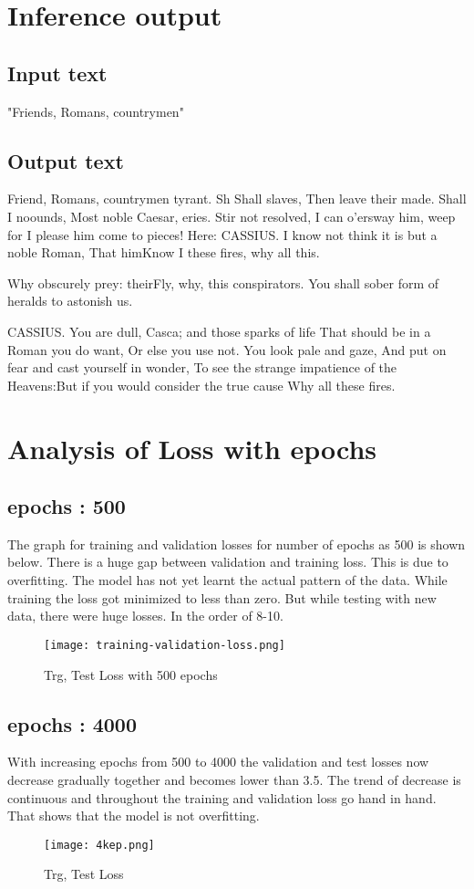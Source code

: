 \documentclass[conference]{IEEEtran}
\begin{document}
\section{Inference output}
\subsection{Input text} 
"Friends, Romans, countrymen"
\subsection{Output text} 
Friend, Romans, countrymen tyrant. Sh Shall slaves, Then leave their made. Shall I noounds, Most noble Caesar, eries. Stir not resolved,
I can o’ersway him, weep for I please him come to pieces! Here:
CASSIUS.
I know not think it is but a noble Roman, That himKnow I these fires, why all this.

Why obscurely prey: theirFly, why, this conspirators. You shall sober form of heralds to astonish us.

CASSIUS. You are dull, Casca; and those sparks of life That should be in a Roman you do want, Or else you use not. You look pale and gaze, And put on fear and cast yourself in wonder, To see the strange impatience of the Heavens:But if you would consider the true cause Why all these fires.
\section{Analysis of Loss with epochs}
\subsection{epochs : 500}
The graph for training and validation losses for number of epochs as 500 is shown below. There is a huge gap between validation and training loss. This is due to overfitting. The model has not yet learnt the actual pattern of the data. While training the loss got minimized to less than zero. But while testing with new data, there were huge losses. In the order of 8-10.
\begin{figure}[H]
    \centering
    \texttt{[image: training-validation-loss.png]}
    \caption{Trg, Test Loss with 500 epochs}
    \label{fig:epoch500}
\end{figure}

\subsection{epochs : 4000}
With increasing epochs from 500 to 4000 the validation and test losses now decrease gradually together and becomes lower than 3.5. The trend of decrease is continuous and throughout the training and validation loss go hand in hand. That shows that the model is not overfitting.
\begin{figure}[H]
    \centering
    \texttt{[image: 4kep.png]}
    \caption{Trg, Test Loss}
    \label{fig:epoch4000}
\end{figure}
\end{document}
